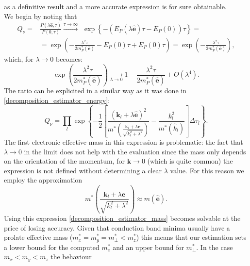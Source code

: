 as a definitive result and a more accurate expression is for sure obtainable.\\
We begin by noting that
\begin{equation}
\begin{split}
    Q_\nu=&\frac{P(\lambda\hat{\mathbf{e}},\tau)}{P(0,\tau)}\xrightarrow[]{\tau\to\infty}\hspace{5pt}\exp{\left\{-\left(E_P(\lambda\hat{\mathbf{e}})\tau-E_P(0)\right)\tau\right\}}=\\
    &=\exp{\left(-\frac{\lambda^2\tau}{2m^*_P(\hat{\mathbf{e}})}-E_P(0)\tau+E_P(0)\tau\right)}=\exp{\left(-\frac{\lambda^2\tau}{2m^*_P(\hat{\mathbf{e}})}\right)},
\end{split}
\end{equation}
which, for $\lambda\to 0$ becomes:
\begin{equation}
    \exp{\left(\frac{\lambda^2\tau}{2m^*_P(\hat{\mathbf{e}})}\right)}\xrightarrow[\lambda\to 0]{}1-\frac{\lambda^2\tau}{2m^*_P(\hat{\mathbf{e}})}+O(\lambda^4).
    \label{effective_mass_taylor}
\end{equation}
The ratio can be explicited in a similar way as it was done in \ref{decomposition_estimator_energy}:
\begin{equation}
    Q_\nu=\prod_l\exp\left\{-\frac{1}{2}\left[\frac{(\mathbf{k}_l+\lambda\hat{\mathbf{e}})^2}{m^*\left({\frac{\mathbf{k}_l+\lambda\mathbf{e}}{\sqrt{k^2_l+\lambda^2}}}\right)}-\frac{k^2_l}{m^*(\hat{k}_l)}\right]\Delta\tau_l\right\}.
    \label{decomposition_estimator_mass}
\end{equation}
The first electronic effective mass in this expression is problematic: the fact that $\lambda\to 0$ in the limit does not help with the evaluation since the mass only depends on the orientation of 
the momentum, for $\mathbf{k}\to 0$ (which is quite common) the expression is not defined without determining a clear $\lambda$ value. For this reason 
we employ the approximation
\begin{equation}
    m^*\left({\frac{\mathbf{k}_l+\lambda\mathbf{e}}{\sqrt{k^2_l+\lambda^2}}}\right)\approx m(\hat{\mathbf{e}}).
    \label{effective_mass_approx}
\end{equation}
Using this expression \ref{decomposition_estimator_mass} becomes solvable at the price of losing accuracy. Given that conduction band minima usually have a prolate effective mass 
($m^*_x=m^*_y=m^*_{\perp}<m^*_z$) this means that our estimation sets a lower bound for the computed $m^*_z$ and an upper bound for $m^*_\perp$. In the case $m_x<m_y<m_z$ the behaviour 
